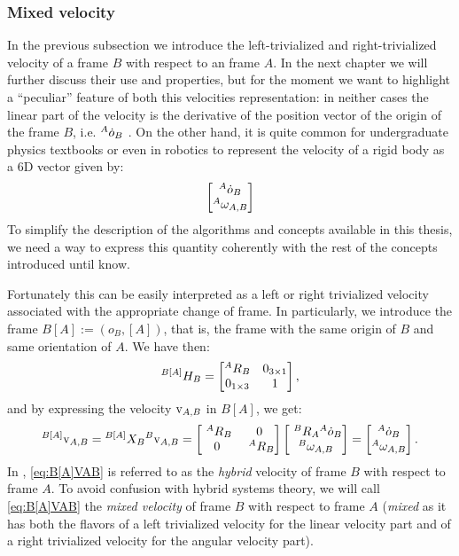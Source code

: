 \subsubsection{Mixed velocity}
In the previous subsection we introduce the left-trivialized and right-trivialized velocity of a frame $B$ with respect to an frame $A$. In the next chapter we will further discuss their use and properties, but for the moment we want to highlight a ``peculiar'' feature of both this velocities representation: in neither cases the linear part of the velocity is the derivative of the position vector of the origin of the frame $B$, i.e. $\hspace{0em}^A \dot{o}_B$ . On the other hand, it is quite common for undergraduate physics textbooks or even in robotics \citep{siciliano2010robotics} to represent the velocity of a rigid body as a 6D vector given by:
\begin{equation}
\begin{bmatrix}
   \hspace{0em}^A \dot{o}_B \\
   \hspace{0em}^A \omega_{A,B}
\end{bmatrix}
\end{equation}
To simplify the description of the algorithms and concepts available in this thesis, we need a way to express this quantity coherently with the rest of the concepts introduced until know.

Fortunately this can be easily interpreted as a left or right trivialized velocity associated with the appropriate change of frame. In particularly, we introduce the frame $B[A] := (o_B,[A])$, that is, the frame
with the same origin of $B$ and same
orientation of $A$. We have then:
\begin{equation}
    \hspace{0em}^{B[A]} H_B = 
    \begin{bmatrix}
     \hspace{0em}^A R_B & 0_{3 \times 1} \\
      0_{1 \times 3} & 1 
    \end{bmatrix},
\end{equation}
and by expressing the velocity ${\rm v}_{A,B}$ in $B[A]$, we get:
\begin{equation}\label{eq:B[A]VAB}
  \hspace{0em}^{B[A]} {\rm v}_{A,B} = 
  \hspace{0em}^{B[A]}X_B \hspace{0em}^B {\rm v}_{A,B} = 
   \begin{bmatrix} ~^{A} {R}_{B} & 0 \\ 0 &  ~^{A} {R}_{B}  \end{bmatrix} \begin{bmatrix} ~^{B} {R}_{A} {}^{A} \dot{o}_B \\ {}^B \omega_{A,B}  \end{bmatrix} 
   = \begin{bmatrix} \hspace{0em}^A \dot{o}_B \\ \hspace{0em}^A \omega_{A,B} \end{bmatrix}.
\end{equation}
In \citep{bruyninckx1996symbolic,murray1994,englsberger2016}, \eqref{eq:B[A]VAB} is referred to as the \emph{hybrid} velocity of frame $B$ with respect to frame $A$.
To avoid confusion with hybrid systems theory, we will call
\eqref{eq:B[A]VAB} the {\em mixed velocity} 
of frame $B$ with respect to frame $A$ ({\em mixed} as it has both the flavors of a left trivialized velocity for the linear velocity part and of a right trivialized velocity for
the angular velocity part).

